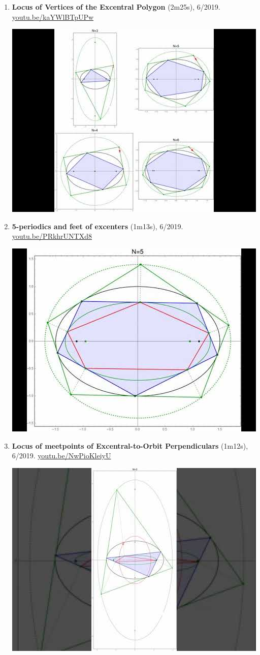 \documentclass[12pt]{article}
\begin{document}
\begin{enumerate}[resume]
\item \textbf{Locus of Vertices of the Excentral Polygon} (2m25s), 6/2019. \href{https://youtu.be/kaYWlBTpUPw}{\url{youtu.be/kaYWlBTpUPw}}
\begin{center}\includegraphics[width=.5\textwidth]{pics/kaYWlBTpUPw.jpg}\end{center}
% 
\item \textbf{5-periodics and feet of excenters} (1m13s), 6/2019. \href{https://youtu.be/PRkhrUNTXd8}{\url{youtu.be/PRkhrUNTXd8}}
\begin{center}\includegraphics[width=.5\textwidth]{pics/PRkhrUNTXd8.jpg}\end{center}
% 
\item \textbf{Locus of meetpoints of Excentral-to-Orbit Perpendiculars} (1m12s), 6/2019. \href{https://youtu.be/NwPioKleiyU}{\url{youtu.be/NwPioKleiyU}}
\begin{center}\includegraphics[width=.5\textwidth]{pics/NwPioKleiyU.jpg}\end{center}
% 
\end{enumerate}
\end{document}
